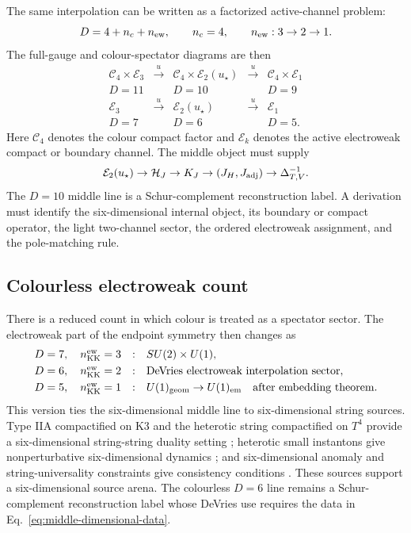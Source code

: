 The same interpolation can be written as a factorized active-channel problem:
\begin{equation}
  D=4+n_c+n_{\rm ew},\qquad n_c=4,\qquad n_{\rm ew}:3\to2\to1 .
  \label{eq:factorized-active-channel-count}
\end{equation}
The full-gauge and colour-spectator diagrams are then
\begin{equation}
\begin{array}{ccccc}
\mathcal C_4\times\mathcal E_3
&\xrightarrow{\ u\ }&
\mathcal C_4\times\mathcal E_2(u_\star)
&\xrightarrow{\ u\ }&
\mathcal C_4\times\mathcal E_1
\\
D=11 && D=10 && D=9
\\[4pt]
\mathcal E_3
&\xrightarrow{\ u\ }&
\mathcal E_2(u_\star)
&\xrightarrow{\ u\ }&
\mathcal E_1
\\
D=7 && D=6 && D=5 .
\end{array}
\label{eq:factorized-dimensional-channel}
\end{equation}
Here \(\mathcal C_4\) denotes the colour compact factor and
\(\mathcal E_k\) denotes the active electroweak compact or boundary channel.
The middle object must supply
\[
  \mathcal E_2(u_\star)\to\mathcal H_J\to K_J
  \to(J_H,J_{\rm adj})\to\Delta^{-1}_{T,V}.
\]
The \(D=10\) middle line is a Schur-complement reconstruction label.  A
derivation must identify the six-dimensional internal object, its boundary or
compact operator, the light two-channel sector, the ordered electroweak
assignment, and the pole-matching rule.

\subsection{Colourless electroweak count}
\label{app:colourless-count}

There is a reduced count in which colour is treated as a spectator sector.  The
electroweak part of the endpoint symmetry then changes as
\begin{equation}
\begin{array}{ccl}
D=7,\quad n_{\rm KK}^{\rm ew}=3
&:&
SU(2)\times U(1),
\\[3pt]
D=6,\quad n_{\rm KK}^{\rm ew}=2
&:&
\hbox{DeVries electroweak interpolation sector},
\\[3pt]
D=5,\quad n_{\rm KK}^{\rm ew}=1
&:&
U(1)_{\rm geom}\to U(1)_{\rm em}\quad\hbox{after embedding theorem}.
\end{array}
\label{eq:colourless-dimensional-chain}
\end{equation}
This version ties the six-dimensional middle line to six-dimensional string
sources.  Type IIA compactified on K3 and the heterotic string compactified on
\(T^4\) provide a six-dimensional string-string duality setting
\cite{Strominger1995,Sen1995}; heterotic small instantons give nonperturbative
six-dimensional dynamics \cite{WittenSmallInstantons1995}; and
six-dimensional anomaly and string-universality constraints give consistency
conditions \cite{KumarTaylor2009}.  These sources support a six-dimensional
source arena.  The colourless \(D=6\) line remains a Schur-complement
reconstruction label whose DeVries use requires the data in
Eq.~\eqref{eq:middle-dimensional-data}.

